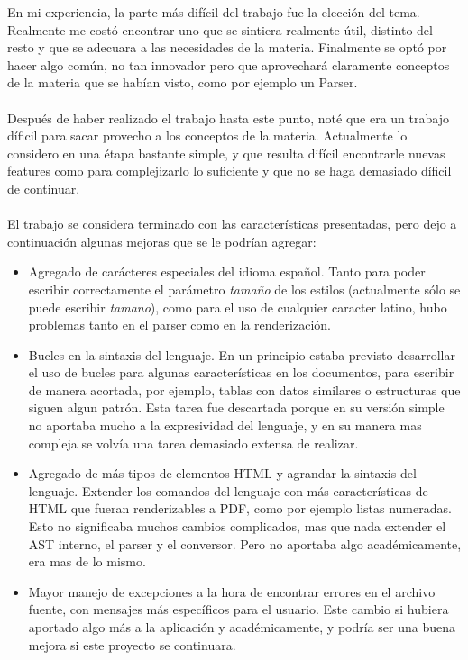 \documentclass{article}
\begin{document}
En mi experiencia, la parte más difícil del trabajo fue la elección del tema. Realmente me costó encontrar uno que se sintiera realmente útil, distinto del resto y que se adecuara a las necesidades de la materia. Finalmente se optó por hacer algo común, no tan innovador pero que aprovechará claramente conceptos de la materia que se habían visto, como por ejemplo un Parser.
\\~\\
Después de haber realizado el trabajo hasta este punto, noté que era un trabajo díficil para sacar provecho a los conceptos de la materia. Actualmente lo considero en una étapa bastante simple, y que resulta difícil encontrarle nuevas features como para complejizarlo lo suficiente y que no se haga demasiado díficil de continuar.
\\~\\
El trabajo se considera terminado con las características presentadas, pero dejo a continuación algunas mejoras que se le podrían agregar:
\begin{itemize}
    \item Agregado de carácteres especiales del idioma español. Tanto para poder escribir correctamente el parámetro \emph{tamaño} de los estilos (actualmente sólo se puede escribir \emph{tamano}), como para el uso de cualquier caracter latino, hubo problemas tanto en el parser como en la renderización.
    \item Bucles en la sintaxis del lenguaje. En un principio estaba previsto desarrollar el uso de bucles para algunas características en los documentos, para escribir de manera acortada, por ejemplo, tablas con datos similares o estructuras que siguen algun patrón. Esta tarea fue descartada porque en su versión simple no aportaba mucho a la expresividad del lenguaje, y en su manera mas compleja se volvía una tarea demasiado extensa de realizar.
    \item Agregado de más tipos de elementos HTML y agrandar la sintaxis del lenguaje. Extender los comandos del lenguaje con más características de HTML que fueran renderizables a PDF, como por ejemplo listas numeradas. Esto no significaba muchos cambios complicados, mas que nada extender el AST interno, el parser y el conversor. Pero no aportaba algo académicamente, era mas de lo mismo.
    \item Mayor manejo de excepciones a la hora de encontrar errores en el archivo fuente, con mensajes más específicos para el usuario. Este cambio si hubiera aportado algo más a la aplicación y académicamente, y podría ser una buena mejora si este proyecto se continuara.
\end{itemize}
\end{document}
